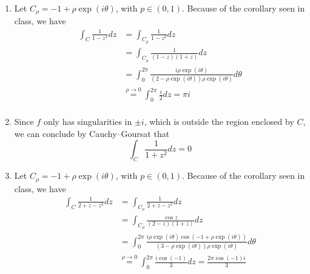 \documentclass{article}
\renewcommand{\exp}[1]{\operatorname{exp}\left(#1\right)}
\begin{document}
    \begin{enumerate}[label=(\alph*)]
        \item Let $C_\rho = -1 + \rho\exp{i\theta}$, with $p \in (0, 1)$. Because of the corollary seen in class, we have
        \begin{align*}
            \int_C \frac{1}{1 - z^2}dz &= \int_{C_\rho} \frac{1}{1 - z^2}dz \\
            &= \int_{C_\rho} \frac{1}{(1 - z)(1 + z)}dz \\
            &= \int_0^{2\pi} \frac{i\rho\exp{i\theta}}{(2 - \rho\exp{i\theta})\rho\exp{i\theta}}d\theta \\
            &\overset{\rho \to 0}{=} \int_0^{2\pi} \frac{i}{2}dz = \pi i \\
        \end{align*}
        \item Since $f$ only has singularities in $\pm i$, which is outside the region enclosed by $C$, we can conclude by Cauchy–Goursat that
        \begin{equation*}
            \int_C \frac{1}{1 + z^2}dz = 0
        \end{equation*}
        \item Let $C_\rho = -1 + \rho\exp{i\theta}$, with $p \in (0, 1)$. Because of the corollary seen in class, we have
        \begin{align*}
            \int_C \frac{1}{2 + z - z^2}dz &= \int_{C_\rho} \frac{1}{2 + z - z^2}dz \\
            &= \int_{C_\rho} \frac{\cos{z}}{(2 - z)(1 + z)}dz \\
            &= \int_0^{2\pi} \frac{i\rho\exp{i\theta}\cos(-1 + \rho\exp{i\theta})}{(3 - \rho\exp{i\theta})\rho\exp{i\theta}}d\theta \\
            &\overset{\rho \to 0}{=} \int_0^{2\pi} \frac{i\cos(-1)}{3}dz = \frac{2\pi\cos(-1)i}{3} \\
        \end{align*}
    \end{enumerate}
\end{document}
